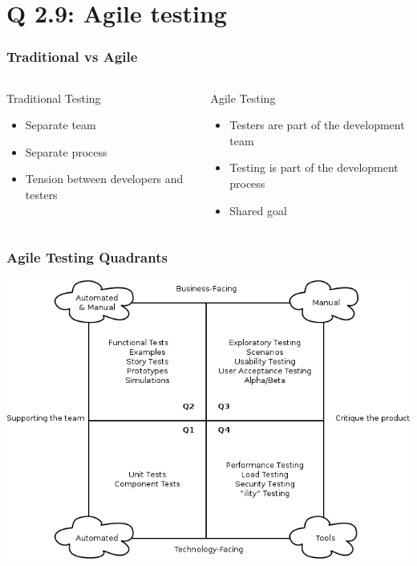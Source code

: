 
\section{Q 2.9: Agile testing}

\begin{frame}
    \frametitle{Traditional vs Agile}
    \begin{columns}[c]
        \begin{block}{Traditional Testing}
            \begin{itemize}
                \item Separate team
                \item Separate process
                \item Tension between developers and testers
            \end{itemize}
        \end{block}

        \begin{block}{Agile Testing}
            \begin{itemize}
                \item Testers are part of the development team
                \item Testing is part of the development process
                \item Shared goal
            \end{itemize}
        \end{block}
    \end{columns}
\end{frame}

\begin{frame}
    \frametitle{Agile Testing Quadrants}
    \centering
    \includegraphics[scale=0.4]{agile_test_quadrants.png}
\end{frame}

